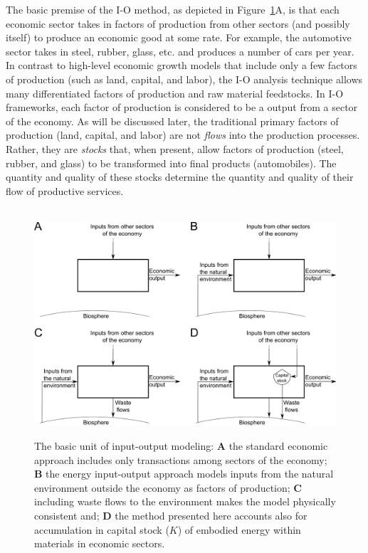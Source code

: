 The basic premise of the I-O method, 
as depicted in Figure~\ref{fig:basic_unit}A, 
is that each economic sector takes in factors of production 
from other sectors (and possibly itself) 
to produce an economic good at some rate. 
For example, the automotive sector takes in steel, rubber, glass, etc. 
and produces a number of cars per year. 
In contrast to high-level economic growth models 
that include only a few factors of production (such as land, capital, and labor), 
the I-O analysis technique allows many differentiated factors of production 
and raw material feedstocks.\cite{Costanza:1980ww} 
In I-O frameworks, each factor of production 
is considered to be a output from a sector of the economy. 
As will be discussed later,
the traditional primary factors of production (land, capital, and labor) 
are not \emph{flows} into the production processes. 
Rather, they are \emph{stocks} that, when present, 
allow factors of production (steel, rubber, and glass) 
to be transformed into final products (automobiles). 
The quantity and quality of these stocks 
determine the quantity and quality of their flow of productive services.

\begin{figure}[!ht]
\centering\
\includegraphics[width=\linewidth]{Part_0/Chapter_Introduction/images/Basic_unit_square.pdf}
\caption[The basic unit of input-output modeling]{The basic unit 
of input-output modeling: 
\textbf{A} the standard economic approach includes only transactions 
among sectors of the economy; 
\textbf{B} the energy input-output approach models inputs 
from the natural environment outside the economy as factors of production; 
\textbf{C} including waste flows to the environment makes the model physically consistent and;
\textbf{D} the method presented here accounts also for accumulation
in capital stock
($K$) of embodied energy within materials in economic sectors.}
\label{fig:basic_unit}
\end{figure}

